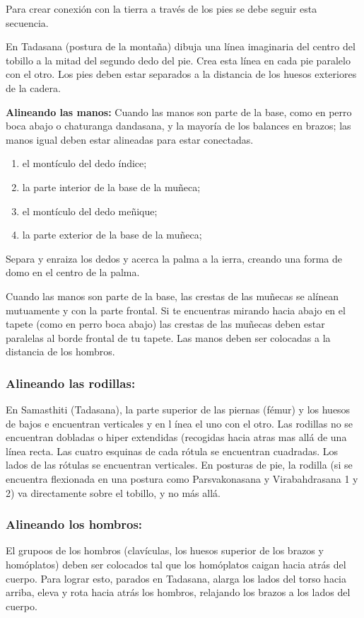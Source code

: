 Para crear conexión con la tierra a través de los pies se debe seguir esta secuencia.

En Tadasana (postura de la montaña) dibuja una línea imaginaria del centro del tobillo a la mitad del segundo dedo del pie. Crea esta línea en cada pie paralelo con el otro. Los pies deben estar separados a la distancia de los huesos exteriores de la cadera.

\textbf{Alineando las manos:}
Cuando las manos son parte de la base, como en perro boca abajo o chaturanga dandasana, y la mayoría de los balances en brazos; las manos igual deben estar alineadas para estar conectadas.
\begin{enumerate}
	\item el montículo del dedo índice;
	\item la parte interior de la base de la muñeca;
	\item el montículo del dedo meñique;
	\item la parte exterior de la base de la muñeca;
\end{enumerate}

Separa y enraiza los dedos y acerca la palma a la ierra, creando una forma de domo en el centro de la palma.

Cuando las manos son parte de la base, las crestas de las muñecas se alínean mutuamente y con la parte frontal. Si te encuentras mirando hacia abajo en el tapete (como en perro boca abajo) las crestas de las muñecas deben estar paralelas al borde frontal de tu tapete. Las manos deben ser colocadas a la distancia de los hombros.

\subsubsection{Alineando las rodillas:}
En Samasthiti (Tadasana), la parte superior de las piernas (fémur) y los huesos de bajos e encuentran verticales y en l ínea el uno con el otro. Las rodillas no se encuentran dobladas o hiper extendidas (recogidas hacia atras mas allá de una línea recta. Las cuatro esquinas de cada rótula se encuentran cuadradas. Los lados de las rótulas se encuentran verticales. En posturas de pie, la rodilla (si se encuentra flexionada en una postura como Parsvakonasana y Virabahdrasana 1 y 2) va directamente sobre el tobillo, y no más allá.

\subsubsection{Alineando los hombros:}
El grupoos de los hombros (clavículas, los huesos superior de los brazos y homóplatos) deben ser colocados tal que los homóplatos caigan hacia atrás del cuerpo. Para lograr esto, parados en Tadasana, alarga los lados del torso hacia arriba, eleva y rota hacia atrás los hombros, relajando los brazos a los lados del cuerpo.

